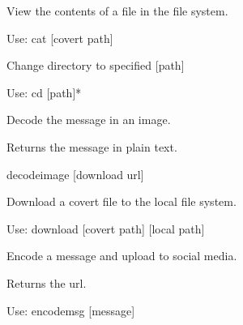 \documentclass[letterpaper,12pt,openany,oneside]{sphinxmanual}
\begin{document}
\begin{fulllineitems}

\begin{fulllineitems}
\label{main:main.Console.do_cat}
View the contents of a file in the file system.

Use: cat {[}covert path{]}

\end{fulllineitems}


\begin{fulllineitems}
\label{main:main.Console.do_cd}
Change directory to specified {[}path{]}

Use: cd {[}path{]}*

\end{fulllineitems}


\begin{fulllineitems}
\label{main:main.Console.do_decodemsg}
Decode the message in an image.

Returns the message in plain text.

decodeimage {[}download url{]}

\end{fulllineitems}


\begin{fulllineitems}
\label{main:main.Console.do_download}
Download a covert file to the local file system.

Use: download {[}covert path{]} {[}local path{]}

\end{fulllineitems}


\begin{fulllineitems}
\label{main:main.Console.do_encodemsg}
Encode a message and upload to social media.

Returns the url.

Use: encodemsg {[}message{]}

\end{fulllineitems}


\end{fulllineitems}
\end{document}
